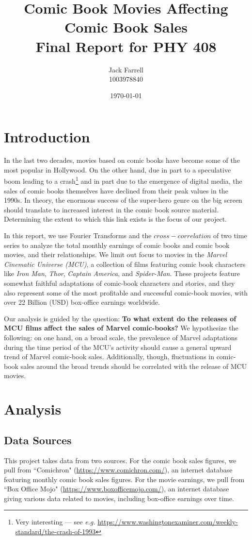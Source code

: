 \documentclass[12pt]{article}
\title{Comic Book Movies Affecting Comic Book Sales \vspace{0.5em}\\ \Large Final Report for PHY 408}
\date{\today}
\author{Jack Farrell \\ 1003978840}
\begin{document}
\maketitle
\tableofcontents
\pagebreak
\section{Introduction}
In the last two decades, movies based on comic books have become some of the most popular in Hollywood.  On the other hand, due in part to a speculative boom leading to a crash\footnote{Very interesting --- see \textit{e.g.} \hyperlink{https://www.washingtonexaminer.com/weekly-standard/the-crash-of-1993}{https://www.washingtonexaminer.com/weekly-standard/the-crash-of-1993}} and in part due to the emergence of digital media, the sales of comic books themselves have declined from their peak values in the 1990s.  In theory, the enormous success of the super-hero genre on the big screen should translate to increased interest in the comic book source material.  Determining the extent to which this link exists is the focus of our project.

In this report, we use Fourier Transforms and the $cross-correlation$ of two time series to analyze the total monthly earnings of comic books and comic book movies, and their relationships. We limit out focus to movies in the \textit{Marvel Cinematic Universe (MCU)}, a collection of films featuring comic book characters like \textit{Iron Man}, \textit{Thor}, \textit{Captain America}, and \textit{Spider-Man}.  These projects feature somewhat faithful adaptations of comic-book characters and stories, and they also represent some of the most profitable and successful comic-book movies, with over 22 Billion (USD) box-office earnings worldwide.

Our analysis is guided by the question: \textbf{To what extent do the releases of MCU films affect the sales of Marvel comic-books?}  We hypothesize the following: on one hand, on a broad scale, the prevalence of Marvel adaptations during the time period of the MCU's activity should cause a general upward trend of Marvel comic-book sales.  Additionally, though, fluctuations in comic-book sales around the broad trends should be correlated with the release of MCU movies.

\section{Analysis}
\subsection{Data Sources}
This project takes data from two sources.  For the comic book sales figures, we pull from ``Comichron" (\hyperlink{https://www.comichron.com/}{https://www.comichron.com/}), an internet database featuring monthly comic book sales figures.  For the movie earnings, we pull from ``Box Office Mojo" (\hyperlink{https://www.boxofficemojo.com/}{https://www.boxofficemojo.com/}), an internet database giving various data related to movies, including box-office earnings over time.
\end{document}
